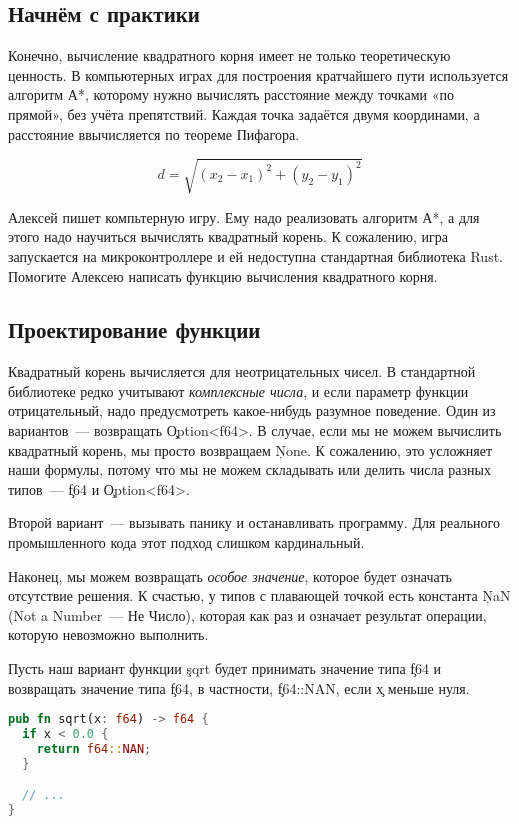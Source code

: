 \subsection{Начнём с практики}

Конечно, вычисление квадратного корня имеет не только теоретическую ценность.
В компьютерных играх для построения кратчайшего пути используется алгоритм А*, которому нужно вычислять расстояние между точками «по прямой», без учёта препятствий.
Каждая точка задаётся двумя координами, а расстояние ввычисляется по теореме Пифагора.

$$
d = \sqrt {(x_2 - x_1)^2 + (y_2 - y_1)^2}
$$

\begin{Exercise}
  \Question
  Алексей пишет компьтерную игру.
  Ему надо реализовать алгоритм А*, а для этого надо научиться вычислять квадратный корень.
  К сожалению, игра запускается на микроконтроллере и ей недоступна стандартная библиотека Rust.
  Помогите Алексею написать функцию вычисления квадратного корня.
\end{Exercise}

\subsection{Проектирование функции}

Квадратный корень вычисляется для неотрицательных чисел.
В стандартной библиотеке редко учитывают {\em комплексные числа}, и если параметр функции отрицательный, надо предусмотреть какое-нибудь разумное поведение.
Один из вариантов~--- возвращать \c{Option<f64>}.
В случае, если мы не можем вычислить квадратный корень, мы просто возвращаем \c{None}.
К сожалению, это усложняет наши формулы, потому что мы не можем складывать или делить числа разных типов~--- \c{f64} и \c{Option<f64>}.

Второй вариант~--- вызывать панику и останавливать программу.
Для реального промышленного кода этот подход слишком кардинальный.

Наконец, мы можем возвращать {\em особое значение}, которое будет означать отсутствие решения.
К счастью, у типов с плавающей точкой есть константа \c{NaN} (Not a Number~--- Не Число), которая как раз и означает результат операции, которую невозможно выполнить.

Пусть наш вариант функции \c{sqrt} будет принимать значение типа \c{f64} и возвращать значение типа \c{f64}, в частности, \c{f64::NAN}, если \c{x} меньше нуля.

\begin{lstlisting}[language=Rust]
pub fn sqrt(x: f64) -> f64 {
  if x < 0.0 {
    return f64::NAN;
  }

  // ...
}
\end{lstlisting}

